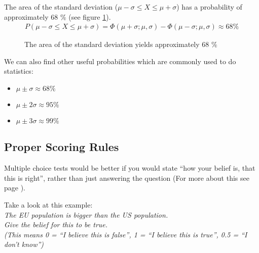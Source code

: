 \documentclass[../main/Notes.tex]{subfiles}
\begin{document}
The area of the standard deviation ($\mu - \sigma \leq X \leq \mu + \sigma$) has a probability of approximately 68 \% (see figure \ref{fig:2014-05-09-std}).
\begin{align*}
P(\mu - \sigma \leq X \leq \mu + \sigma) = \Phi(\mu+\sigma;\mu,\sigma) - \Phi(\mu-\sigma;\mu,\sigma) \approx 68 \%
\end{align*}

\begin{figure}[!ht]
\centering
{}
\caption{The area of the standard deviation yields approximately 68 \%}
\label{fig:2014-05-09-std}
\end{figure}

\begin{samepage}
We can also find other useful probabilities which are commonly used to do statistics:
\begin{itemize}
	\item $\mu \pm \sigma \approx 68\%$
	\item $\mu \pm 2\sigma \approx 95\%$
	\item $\mu \pm 3\sigma \approx 99\%$
\end{itemize}
\end{samepage}


\subsection{Proper Scoring Rules}
Multiple choice tests would be better if you would state ``how your belief is, that this is right'', rather than just answering the question (For more about this see page \pageref{ex4_4_solution}).

\bigskip

Take a look at this example: \\ \textit{The EU population is bigger than the US population. \\
Give the belief for this to be true. \\(This means 0 = ``I believe this is false'', 1 = ``I believe this is true'', 0.5 = ``I don't know'')}
\end{document}

